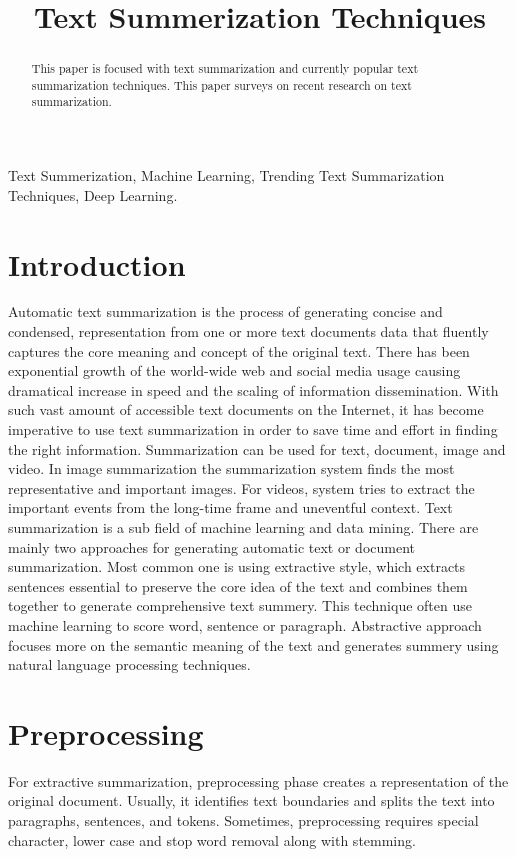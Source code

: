 \documentclass[conference]{IEEEtran}
\begin{document}
\title{Text Summerization Techniques}
\author{
}
\maketitle
\begin{abstract}
This paper is focused with text summarization and currently popular text summarization techniques. This paper surveys on recent research on text summarization. 
\end{abstract}
\begin{IEEEkeywords}
Text Summerization, Machine Learning, Trending Text Summarization Techniques, Deep Learning.
\end{IEEEkeywords}
\section{Introduction}
Automatic text summarization is the process of generating concise and condensed, representation from one or more text documents data that fluently captures the core meaning and concept of the original text. There has been exponential growth of the world-wide web and social media usage causing dramatical increase in speed and the scaling of information dissemination. With such vast amount of accessible text documents on the Internet, it has become imperative to use text summarization in order to save time and effort in finding the right information. Summarization can be used for text, document, image and video. In image summarization the summarization system finds the most representative and important images. For videos, system tries to extract the important events from the long-time frame and uneventful context. Text summarization is a sub field of machine learning and data mining. There are mainly two approaches for generating automatic text or document summarization. Most common one is using extractive style, which extracts sentences essential to preserve the core idea of the text and combines them together to generate comprehensive text summery. This technique often use machine learning to score word, sentence or paragraph. Abstractive approach focuses more on the semantic meaning of the text and generates summery using natural language processing techniques.  

\section{Preprocessing}
For extractive summarization, preprocessing phase creates a representation of the original document. Usually, it identifies text boundaries and splits the text into paragraphs, sentences, and tokens. Sometimes, preprocessing requires special character, lower case and stop word removal along with stemming. 
\end{document}
